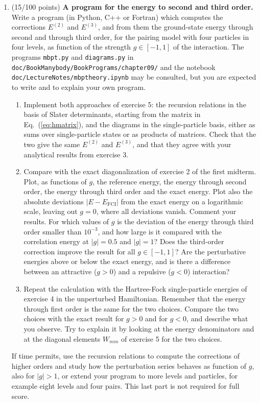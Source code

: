 \documentclass[prc]{revtex4}
\begin{document}
\begin{enumerate}
\item (15/100 points) \textbf{A program for the energy to second and third order.}
Write a program (in Python, C++ or Fortran) which computes the
corrections $E^{(2)}$ and $E^{(3)}$, and from them the ground-state
energy through second and through third order, for the pairing model
with four particles in four levels, as function of the strength
$g\in[-1,1]$ of the interaction. The programs \texttt{mbpt.py} and
\texttt{diagrams.py} in
\texttt{doc/BookManybody/BookPrograms/chapter09/} and the notebook
\texttt{doc/LectureNotes/mbptheory.ipynb} may be consulted, but you
are expected to write and to explain your own program.
\begin{enumerate}
\item Implement both approaches of exercise 5: the recursion relations
  in the basis of Slater determinants, starting from the matrix in
  Eq.~(\ref{eq:hmatrix}), and the diagrams in the single-particle
  basis, either as sums over single-particle states or as products
  of matrices. Check that the two give the same $E^{(2)}$ and
  $E^{(3)}$, and that they agree with your analytical results from
  exercise 3.
\item Compare with the exact diagonalization of exercise 2 of the
  first midterm. Plot, as functions of $g$, the reference energy, the
  energy through second order, the energy through third order and the
  exact energy. Plot also the absolute deviations
  $|E-E_{\mathrm{FCI}}|$ from the exact energy on a logarithmic scale,
  leaving out $g=0$, where all deviations vanish. Comment your
  results. For which values of $g$ is the deviation of the energy
  through third order smaller than $10^{-3}$, and how large is it
  compared with the correlation energy at $|g|=0.5$ and $|g|=1$? Does
  the third-order correction improve the result for all
  $g\in[-1,1]$? Are the perturbative energies above or below the
  exact energy, and is there a difference between an attractive
  ($g>0$) and a repulsive ($g<0$) interaction?
\item Repeat the calculation with the Hartree-Fock single-particle
  energies of exercise 4 in the unperturbed Hamiltonian. Remember
  that the energy through first order is the same for the two
  choices. Compare the two choices with the exact result for $g>0$
  and for $g<0$, and describe what you observe. Try to explain it by
  looking at the energy denominators and at the diagonal elements
  $W_{mm}$ of exercise 5 for the two choices.
\end{enumerate}
If time permits, use the recursion relations to compute the
corrections of higher orders and study how the perturbation series
behaves as function of $g$, also for $|g|>1$, or extend your program
to more levels and particles, for example eight levels and four
pairs. This last part is not required for full score.

\end{enumerate}
\end{document}
